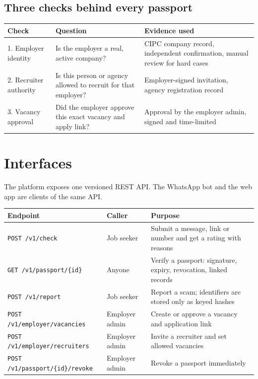 \documentclass[11pt,a4paper]{article}
\newcommand{\tbl}[1]{\textbf{#1}}
\newcommand{\code}[1]{\texttt{\small #1}}
\begin{document}
\subsection{Three checks behind every passport}
\begin{center}
\begin{tabularx}{\textwidth}{@{}lXX@{}}
\toprule
\tbl{Check} & \tbl{Question} & \tbl{Evidence used}\\
\midrule
1. Employer identity & Is the employer a real, active company? & CIPC company record, independent confirmation, manual review for hard cases\\
2. Recruiter authority & Is this person or agency allowed to recruit for that employer? & Employer-signed invitation, agency registration record\\
3. Vacancy approval & Did the employer approve this exact vacancy and apply link? & Approval by the employer admin, signed and time-limited\\
\bottomrule
\end{tabularx}
\end{center}

\section{Interfaces}
The platform exposes one versioned REST API. The WhatsApp bot and the web app are clients of the same API.

\begin{center}
\small
\begin{tabularx}{\textwidth}{@{}>{\raggedright\arraybackslash}p{5.1cm}>{\raggedright\arraybackslash}p{2.3cm}X@{}}
\toprule
\tbl{Endpoint} & \tbl{Caller} & \tbl{Purpose}\\
\midrule
\code{POST /v1/check} & Job seeker & Submit a message, link or number and get a rating with reasons\\
\code{GET /v1/passport/\{id\}} & Anyone & Verify a passport: signature, expiry, revocation, linked records\\
\code{POST /v1/report} & Job seeker & Report a scam; identifiers are stored only as keyed hashes\\
\code{POST /v1/employer/vacancies} & Employer admin & Create or approve a vacancy and application link\\
\code{POST /v1/employer/recruiters} & Employer admin & Invite a recruiter and set allowed vacancies\\
\code{POST /v1/passport/\{id\}/revoke} & Employer admin & Revoke a passport immediately\\
\bottomrule
\end{tabularx}
\end{center}
\end{document}

